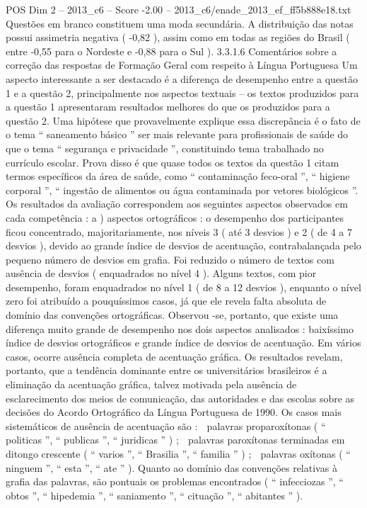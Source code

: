 \begin{textsample}{POS Dim 2 – 2013\_c6 – Score -2.00 – 2013\_c6/enade\_2013\_ef\_ff5b888e18.txt}
Questões em branco constituem uma moda secundária.
A distribuição das notas possui assimetria negativa ( -0,82 ), assim como em todas as regiões do Brasil ( entre -0,55 para o Nordeste e -0,88 para o Sul ). 3.3.1.6 Comentários sobre a correção das respostas de Formação Geral com respeito à Língua Portuguesa Um aspecto interessante a ser destacado é a diferença de desempenho entre a questão 1 e a questão 2, principalmente nos aspectos textuais – os textos produzidos para a questão 1 apresentaram resultados melhores do que os produzidos para a questão 2.
Uma hipótese que provavelmente explique essa discrepância é o fato de o tema “ saneamento básico ” ser mais relevante para profissionais de saúde do que o tema “ segurança e privacidade ”, constituindo tema trabalhado no currículo escolar.
Prova disso é que quase todos os textos da questão 1 citam termos específicos da área de saúde, como “ contaminação feco-oral ”, “ higiene corporal ”, “ ingestão de alimentos ou água contaminada por vetores biológicos ”.
Os resultados da avaliação correspondem aos seguintes aspectos observados em cada competência : a ) aspectos ortográficos : o desempenho dos participantes ficou concentrado, majoritariamente, nos níveis 3 ( até 3 desvios ) e 2 ( de 4 a 7 desvios ), devido ao grande índice de desvios de acentuação, contrabalançada pelo pequeno número de desvios em grafia.
Foi reduzido o número de textos com ausência de desvios ( enquadrados no nível 4 ).
Alguns textos, com pior desempenho, foram enquadrados no nível 1 ( de 8 a 12 desvios ), enquanto o nível zero foi atribuído a pouquíssimos casos, já que ele revela falta absoluta de domínio das convenções ortográficas.
Observou -se, portanto, que existe uma diferença muito grande de desempenho nos dois aspectos analisados : baixíssimo índice de desvios ortográficos e grande índice de desvios de acentuação.
Em vários casos, ocorre ausência completa de acentuação gráfica.
Os resultados revelam, portanto, que a tendência dominante entre os universitários brasileiros é a eliminação da acentuação gráfica, talvez motivada pela ausência de esclarecimento dos meios de comunicação, das autoridades e das escolas sobre as decisões do Acordo Ortográfico da Língua Portuguesa de 1990.
Os casos mais sistemáticos de ausência de acentuação são :  palavras proparoxítonas ( “ politicas ”, “ publicas ”, “ juridicas ” ) ;  palavras paroxítonas terminadas em ditongo crescente ( “ varios ”, “ Brasilia ”, “ familia ” ) ;  palavras oxítonas ( “ ninguem ”, “ esta ”, “ ate ” ).
Quanto ao domínio das convenções relativas à grafia das palavras, são pontuais os problemas encontrados ( “ infecciozas ”, “ obtos ”, “ hipedemia ”, “ saniamento ”, “ cituação ”, “ abitantes ” ).

\end{textsample}

